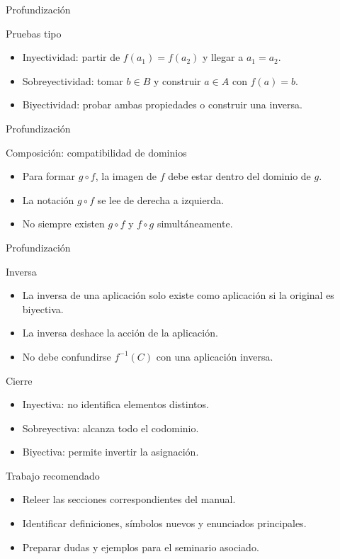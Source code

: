 \documentclass[aspectratio=169,11pt]{beamer}
\begin{document}
\begin{frame}{Profundización}
\begin{block}{Pruebas tipo}
\begin{itemize}
  \item Inyectividad: partir de \(f(a_1)=f(a_2)\) y llegar a \(a_1=a_2\).
  \item Sobreyectividad: tomar \(b\in B\) y construir \(a\in A\) con \(f(a)=b\).
  \item Biyectividad: probar ambas propiedades o construir una inversa.
\end{itemize}
\end{block}
\end{frame}

\begin{frame}{Profundización}
\begin{block}{Composición: compatibilidad de dominios}
\begin{itemize}
  \item Para formar \(g\circ f\), la imagen de \(f\) debe estar dentro del dominio de \(g\).
  \item La notación \(g\circ f\) se lee de derecha a izquierda.
  \item No siempre existen \(g\circ f\) y \(f\circ g\) simultáneamente.
\end{itemize}
\end{block}
\end{frame}

\begin{frame}{Profundización}
\begin{block}{Inversa}
\begin{itemize}
  \item La inversa de una aplicación solo existe como aplicación si la original es biyectiva.
  \item La inversa deshace la acción de la aplicación.
  \item No debe confundirse \(f^{-1}(C)\) con una aplicación inversa.
\end{itemize}
\end{block}
\end{frame}

\begin{frame}{Cierre}
\begin{itemize}
  \item Inyectiva: no identifica elementos distintos.
  \item Sobreyectiva: alcanza todo el codominio.
  \item Biyectiva: permite invertir la asignación.
\end{itemize}
\end{frame}

\begin{frame}{Trabajo recomendado}
\begin{itemize}
  \item Releer las secciones correspondientes del manual.
  \item Identificar definiciones, símbolos nuevos y enunciados principales.
  \item Preparar dudas y ejemplos para el seminario asociado.
\end{itemize}
\end{frame}
\end{document}
